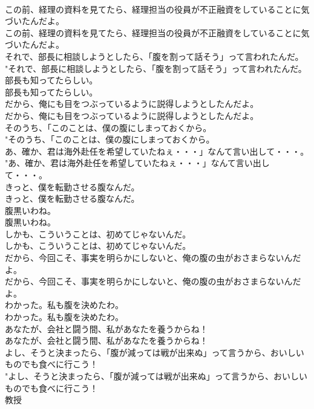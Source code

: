\documentclass[8pt]{extreport}
\begin{document}
\begin{CJK}{UTF8}{min}
\\	この前、経理の資料を見てたら、経理担当の役員が不正融資をしていることに気づいたんだよ。	
\\	この前、経理の資料を見てたら、経理担当の役員が不正融資をしていることに気づいたんだよ。 
\\	それで、部長に相談しようとしたら、「腹を割って話そう」って言われたんだ。	
\\	"それで、部長に相談しようとしたら、「腹を割って話そう」って言われたんだ。 
\\	部長も知ってたらしい。	
\\	部長も知ってたらしい。 
\\	だから、俺にも目をつぶっているように説得しようとしたんだよ。	
\\	だから、俺にも目をつぶっているように説得しようとしたんだよ。 
\\	そのうち、「このことは、僕の腹にしまっておくから。	
\\	"そのうち、「このことは、僕の腹にしまっておくから。 
\\	あ、確か、君は海外赴任を希望していたねぇ・・・」なんて言い出して・・・。	
\\	"あ、確か、君は海外赴任を希望していたねぇ・・・」なんて言い出して・・・。 
\\	きっと、僕を転勤させる腹なんだ。	
\\	きっと、僕を転勤させる腹なんだ。 
\\	腹黒いわね。	
\\	腹黒いわね。 
\\	しかも、こういうことは、初めてじゃないんだ。	
\\	しかも、こういうことは、初めてじゃないんだ。 
\\	だから、今回こそ、事実を明らかにしないと、俺の腹の虫がおさまらないんだよ。	
\\	だから、今回こそ、事実を明らかにしないと、俺の腹の虫がおさまらないんだよ。 
\\	わかった。私も腹を決めたわ。	
\\	わかった。私も腹を決めたわ。 
\\	あなたが、会社と闘う間、私があなたを養うからね！	
\\	あなたが、会社と闘う間、私があなたを養うからね！ 
\\	よし、そうと決まったら、「腹が減っては戦が出来ぬ」って言うから、おいしいものでも食べに行こう！	
\\	"よし、そうと決まったら、「腹が減っては戦が出来ぬ」って言うから、おいしいものでも食べに行こう！ 
\\	教授

\end{CJK}
\end{document}
